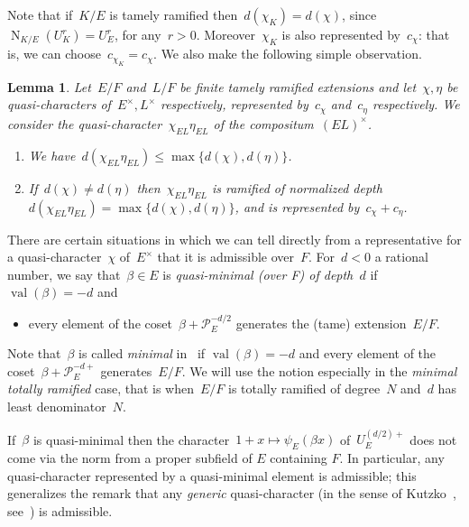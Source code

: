 \documentclass[12pt]{amsart}
\newcommand{\CP}{\mathcal {P}}
\newcommand{\N}{\operatorname{N}}
\newcommand{\val}{\operatorname{val}}
\newtheorem{lem}[thm]{Lemma}
\newtheorem{lem}[equation]{Lemma}
\begin{document}
Note that if~$K/E$ is tamely ramified then~$d(\chi_K)=d(\chi)$, since~$\N_{K/E}(U_K^r)=U_E^r$, for any~$r>0$. Moreover~$\chi_K$ is also represented by~$c_\chi$: that is, we can choose~$c_{\chi_K} = c_{\chi}$. We also make the following simple observation.

\begin{lem}\label{lem:depth}
Let~$E/F$ and~$L/F$ be finite tamely ramified extensions and let~$\chi,\eta$ be quasi-characters of~$E^\times, L^\times$ respectively, represented by~$c_\chi$ and~$c_\eta$ respectively. We consider the quasi-character~$\chi_{EL}\eta_{EL}$ of the compositum~$(EL)^\times$.
\begin{enumerate}
\item We have~$d(\chi_{EL}\eta_{EL})\le \max\{d(\chi),d(\eta)\}$.
\item If~$d(\chi)\ne d(\eta)$ then~$\chi_{EL}\eta_{EL}$ is ramified of normalized depth~$d(\chi_{EL}\eta_{EL})=\max\{d(\chi),d(\eta)\}$, and is represented by~$c_\chi+c_\eta$.
\end{enumerate}
\end{lem}

There are certain situations in which we can tell directly from a representative for a quasi-character~$\chi$ of~$E^\times$ that it is admissible over~$F$. For~$d<0$ a rational number, we say that~$\beta\in E$ is \emph{quasi-minimal (over F) of depth~$d$} if $\val(\beta)=-d$ and
\begin{itemize}
\item every element of the coset~$\beta+\CP_E^{-d/2}$ generates the (tame) extension~$E/F$.
\end{itemize}

Note that~$\beta$ is called \emph{minimal} in~\cite[(1.4.14)]{BK93} if $\val(\beta) = -d$ and every element of the coset~$\beta+\CP_E^{-d+}$ generates~$E/F$. We will use the notion especially in the \emph{minimal totally ramified} case, that is when~$E/F$ is totally ramified of degree~$N$ and~$d$ has least denominator~$N$.

If~$\beta$ is quasi-minimal then the character~$1+x\mapsto \psi_E(\beta x)$ of~$U_E^{(d/2)+}$ does not come via the norm from a proper subfield of $E$ containing $F$. In particular, any quasi-character represented by a quasi-minimal element is admissible; this generalizes the remark that any \emph{generic} quasi-character (in the sense of Kutzko~\cite{Ku80}, see~\cite[Definition~2.2.3]{M86}) is admissible.
\end{document}
